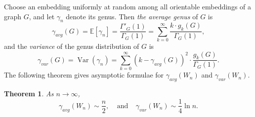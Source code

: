 \documentclass[12pt]{article}
\newtheorem{theorem}{Theorem}[section]
\theoremstyle{definition}
\newcommand{\Var}{\operatorname{Var}}
\newcommand{\E}{\mathbb{E}}
\begin{document}
Choose an embedding uniformly at random among all orientable embeddings of a graph $G$, and let \(\gamma_n\) denote its genus. Then {\it the average genus} of $G$ is
 $$\gamma_{avg}(G)
=\E[{\gamma_n}]=\frac{\Gamma'_G(1)}{\Gamma_G(1)} = \sum_{k=0}^{\infty} \frac{k \cdot g_k(G)}{\Gamma_G(1)},$$
and the {\it variance} of the genus distribution of $G$ is
\[
\gamma_{var}(G) =\Var(\gamma_n)= \sum_{k=0}^{\infty} (k - \gamma_{avg}(G))^2 \cdot \frac{g_k(G)}{\Gamma_G(1)}.
\]
The following theorem gives asymptotic formulae for $\gamma_{avg}(W_n)$ and $\gamma_{var}(W_n)$.

\begin{theorem}
\label{thm:average}
As \(n\to\infty\),
\[
\gamma_{avg}(W_n)\sim \frac{n}{2},~~~~~\mbox{and}~~~~~\gamma_{var}(W_n)\sim \frac14\ln n.
\]
\end{theorem}
\end{document}
